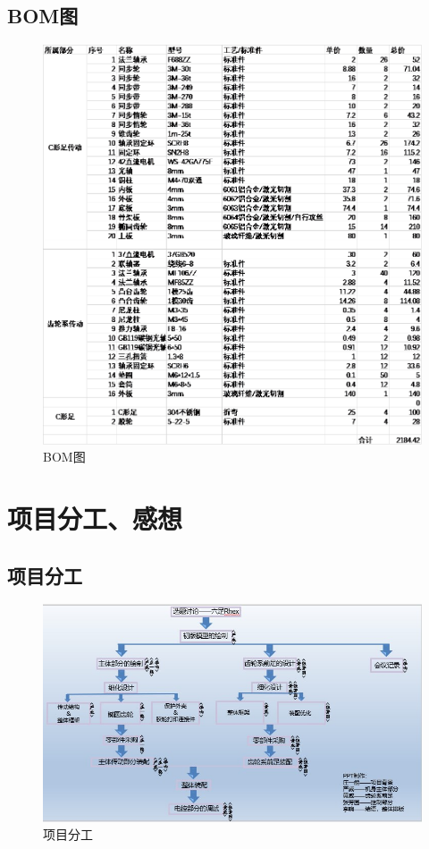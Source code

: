 \documentclass[12pt]{article}
\begin{document}
\begin{CJK}{UTF8}{song}
\subsection{BOM图}
 \begin{figure}[H]
\centering
\includegraphics[width=\textwidth]{chap6//fig3.png}
\caption{BOM图}
\end{figure}

\section{项目分工、感想}
\subsection{项目分工}
 \begin{figure}[H]
\centering
\includegraphics[width=1.2\textwidth]{chap7//fig1.jpg}
\caption{项目分工}
\end{figure}


\end{CJK}
\end{document}
